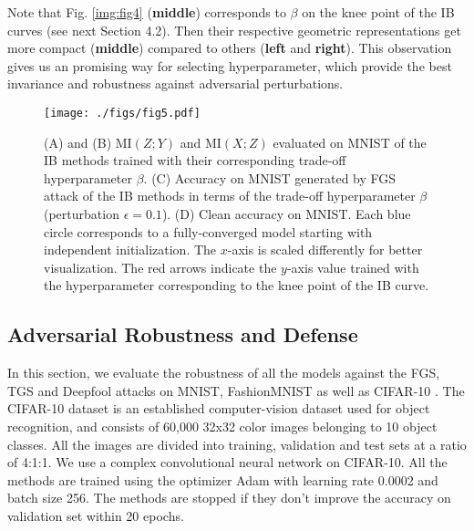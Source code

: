 \documentclass[10pt,journal,compsoc]{IEEEtran}
\begin{document}
Note that Fig. \ref{img:fig4} (\textbf{middle}) corresponds to $\beta$ on the knee point of the IB curves (see next Section 4.2). Then their respective geometric representations get more compact (\textbf{middle}) compared to others (\textbf{left} and \textbf{right}). This observation gives us an promising way for selecting hyperparameter, which provide the best invariance and robustness against adversarial perturbations.\\


\begin{figure}
  \centering
  \texttt{[image: ./figs/fig5.pdf]}
  \caption{(A) and (B) $\mathrm{MI}(Z; Y)$ and $\mathrm{MI}(X; Z)$ evaluated on MNIST of the IB methods trained with their corresponding trade-off hyperparameter $\beta$. 
  (C) Accuracy on MNIST generated by FGS attack of the IB methods in terms of the trade-off hyperparameter $\beta$ (perturbation $\epsilon = 0.1$). (D) Clean accuracy on MNIST. Each blue circle corresponds to a fully-converged model starting with independent initialization. The $x$-axis is scaled differently for better visualization. The red arrows indicate the $y$-axis value trained with the hyperparameter corresponding to the knee point of the IB curve.}
  \label{img:fig5}
\end{figure}



\subsection{Adversarial Robustness and Defense}

In this section, we evaluate the robustness of all the models against the FGS, TGS and Deepfool attacks on MNIST, FashionMNIST as well as CIFAR-10 \cite{Krizhevsky2009LearningML}. The CIFAR-10 dataset is an established computer-vision dataset used for object recognition, and consists of 60,000 32x32 color images belonging to 10 object classes. All the images are divided into training, validation and test sets at a ratio of 4:1:1. We use a complex convolutional neural network on CIFAR-10. All the methods are trained using the optimizer Adam with learning rate 0.0002 and batch size 256. The methods are stopped if they don't improve the accuracy on validation set within 20 epochs. 
\end{document}
